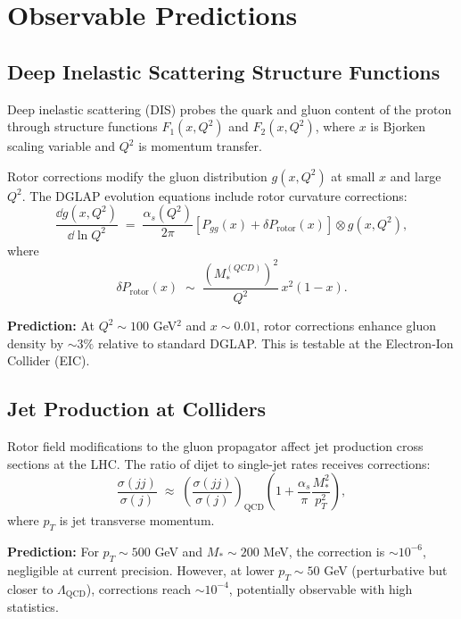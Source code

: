 \documentclass[11pt,a4paper]{article}
\theoremstyle{definition}
\theoremstyle{plain}
\theoremstyle{remark}
\begin{document}
\vspace{1em}

\section{Observable Predictions}
\label{sec:observables}

\subsection{Deep Inelastic Scattering Structure Functions}

Deep inelastic scattering (DIS) probes the quark and gluon content of the proton through structure functions $F_1(x,Q^2)$ and $F_2(x,Q^2)$, where $x$ is Bjorken scaling variable and $Q^2$ is momentum transfer.

Rotor corrections modify the gluon distribution $g(x,Q^2)$ at small $x$ and large $Q^2$. The DGLAP evolution equations include rotor curvature corrections:
\begin{equation}
\frac{\dd g(x,Q^2)}{\dd \ln Q^2} \;=\; \frac{\alpha_s(Q^2)}{2\pi}\left[P_{gg}(x) + \delta P_{\mathrm{rotor}}(x)\right] \otimes g(x,Q^2),
\end{equation}
where
\begin{equation}
\delta P_{\mathrm{rotor}}(x) \;\sim\; \frac{(M_*^{(QCD)})^2}{Q^2}\,x^2(1-x).
\end{equation}

\textbf{Prediction:} At $Q^2 \sim 100$ GeV$^2$ and $x \sim 0.01$, rotor corrections enhance gluon density by $\sim 3\%$ relative to standard DGLAP. This is testable at the Electron-Ion Collider (EIC).

\subsection{Jet Production at Colliders}

Rotor field modifications to the gluon propagator affect jet production cross sections at the LHC. The ratio of dijet to single-jet rates receives corrections:
\begin{equation}
\frac{\sigma(jj)}{\sigma(j)} \;\approx\; \left(\frac{\sigma(jj)}{\sigma(j)}\right)_{\mathrm{QCD}}\left(1 + \frac{\alpha_s}{\pi}\frac{M_\ast^2}{p_T^2}\right),
\end{equation}
where $p_T$ is jet transverse momentum.

\textbf{Prediction:} For $p_T \sim 500$ GeV and $M_\ast \sim 200$ MeV, the correction is $\sim 10^{-6}$, negligible at current precision. However, at lower $p_T \sim 50$ GeV (perturbative but closer to $\Lambda_{\mathrm{QCD}}$), corrections reach $\sim 10^{-4}$, potentially observable with high statistics.
\end{document}
